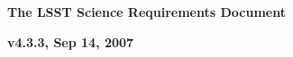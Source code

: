 \documentclass[11pt,letterpaper]{article}
\begin{document}
\centerline{\Large\bf The LSST Science Requirements Document}
\centerline{\large\bf v4.3.3, Sep 14, 2007}











\newpage
\printglossary
\end{document}
